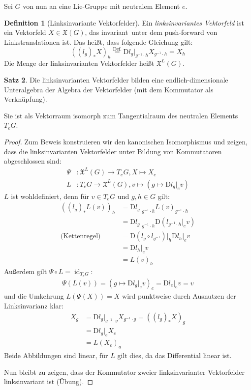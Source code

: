 \documentclass[a4paper]{scrbook}
\numberwithin{equation}{chapter}
\newcommand{\DD}{\mathrm{D}}
\DeclareMathOperator{\id}{id}
\newcommand{\vf}{\mathfrak{X}}
\theoremstyle{definition}
\newtheorem{defn}{Definition}[section]
\newtheorem{satz}[defn]{Satz}
\begin{document}
		Sei $G$ von nun an eine Lie-Gruppe mit neutralem Element $e$.
		\begin{defn}[Linksinvariante Vektorfelder]
			Ein \emph{linksinvariantes Vektorfeld} ist ein Vektorfeld $X\in\mathfrak{X}(G)$, das \glqq invariant\grqq\ unter dem push-forward von Linkstranslationen ist. Das heißt, dass folgende Gleichung gilt:
			\begin{equation*}
				\left((l_g)_*X\right)_h\stackrel{\text{Def.}}{=}\DD l_g\vert_{g^{-1}\cdot h}X_{g^{-1}\cdot h}=X_h
			\end{equation*}
			Die Menge der linksinvarianten Vektorfelder heißt $\vf^L(G)$.
		\end{defn}
		\begin{satz}
			Die linksinvarianten Vektorfelder bilden eine endlich-dimensionale Unteralgebra der Algebra der Vektorfelder (mit dem Kommutator als Verknüpfung).
			
			Sie ist als Vektorraum isomorph zum Tangentialraum des neutralen Elements $T_eG$.
			\begin{proof}
				Zum Beweis konstruieren wir den kanonischen Isomorphismus und zeigen, dass die linksinvarianten Vektorfelder unter Bildung von Kommutatoren abgeschlossen sind:
				\begin{align}
					\Psi&\colon\vf^L(G)\to T_eG, X\mapsto X_e\nonumber\\
					L&\colon T_eG\rightarrow \vf^L(G), v\mapsto (g\mapsto \DD l_g\vert_e v)\label{def:kan_Iso}
				\end{align}
				$L$ ist wohldefiniert, denn für $v\in T_eG$ und $g,h\in G$ gilt:
				\begin{align*}
					\left((l_g)_*L(v)\right)_h&=\DD l_g\vert_{g^{-1}\cdot h}L(v)_{g^{-1}\cdot h}\\
					&=\DD l_g\vert_{g^{-1}\cdot h}\DD (l_{g^{-1}\cdot h}\vert_e v)\\
					\text{(Kettenregel)}\quad &=\DD\left(l_g\circ l_{g^{-1}}\right)\big\vert _h\DD l_h\vert_e v\\
					&=\DD l_h\vert_e v\\
					&=L(v)_h
				\end{align*}
				Außerdem gilt $\Psi\circ L=\id_{T_eG}$:
				\begin{align*}
					\Psi(L(v))= (g\mapsto \DD l_g\vert_e v)_e=\DD l_e\vert_e v=v
				\end{align*}
				und die Umkehrung $L(\Psi(X))=X$ wird punktweise durch Ausnutzen der Linksinvarianz klar:
				\begin{align*}
					X_g&=\DD l_g\vert_{g^{-1}\cdot g}X_{g^{-1}\cdot g}=\left((l_g)_*X\right)_g\\
					&=\DD l_g\vert_e X_e\\
					&=L(X_e)_g
				\end{align*}
				Beide Abbildungen sind linear, für $L$ gilt dies, da das Differential linear ist.
				
				Nun bleibt zu zeigen, dass der Kommutator zweier linksinvarianter Vektorfelder linksinvariant ist (Übung).
			\end{proof}
		\end{satz}
\end{document}
